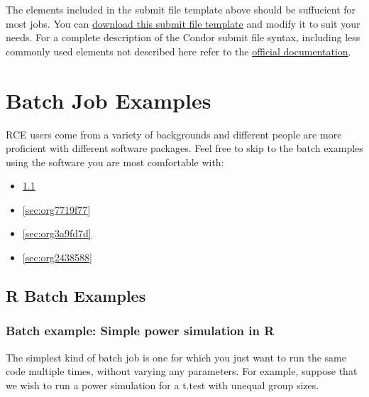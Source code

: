 \documentclass[11pt]{article}
\begin{document}
The elements included in the submit file template above should be suffucient for most jobs. You can \href{template.submit}{download this submit file template} and modify it to suit your needs. For a complete description of the Condor submit file syntax, including less commonly used elements not described here refer to the \href{http://research.cs.wisc.edu/htcondor/manual/current/condor\_submit.html}{official documentation}. 

\section{Batch Job Examples}
\label{sec:org6e78841}
RCE users come from a variety of backgrounds and different people are more proficient with different software packages. Feel free to skip to the batch examples using the software you are most comfortable with:
\begin{itemize}
\item \ref{sec:orgd8e23df}
\item \ref{sec:org7719f77}
\item \ref{sec:org3a9fd7d}
\item \ref{sec:org2438588}
\end{itemize}

\subsection{R Batch Examples}
\label{sec:orgd8e23df}
\subsubsection{Batch example: Simple power simulation in R}
\label{sec:org2f67a27}
The simplest kind of batch job is one for which you just want to run the same code multiple times, without varying any parameters. For example, suppose that we wish to run a power simulation for a t.test with unequal group sizes. 
\end{document}
